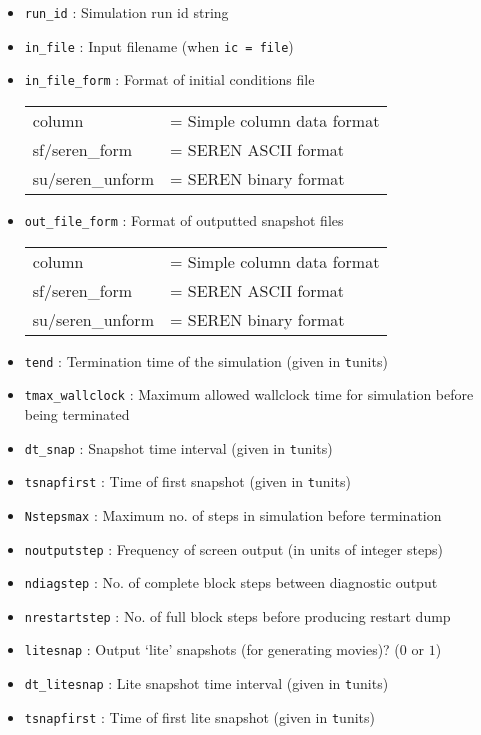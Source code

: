 \documentclass[a4paper]{article}
\newcommand{\var}[1]{\texttt{#1}}
\begin{document}
\begin{itemize}
\item \var{run\_id}  : Simulation run id string

\item \var{in\_file} : Input filename (when \var{ic = file})

\item \var{in\_file\_form} : Format of initial conditions file \\
\begin{tabular}{ll}
column           & = Simple column data format \\
sf/seren\_form   & = SEREN ASCII format \\
su/seren\_unform & = SEREN binary format
\end{tabular}

\item \var{out\_file\_form} : Format of outputted snapshot files \\
\begin{tabular}{ll}
column           & = Simple column data format \\
sf/seren\_form   & = SEREN ASCII format \\
su/seren\_unform & = SEREN binary format
\end{tabular}

\item \var{tend} : Termination time of the simulation (given in {\var tunit}s)

\item \var{tmax\_wallclock} : Maximum allowed wallclock time for simulation before being terminated

\item \var{dt\_snap} : Snapshot time interval (given in {\var tunit}s)

\item \var{tsnapfirst} : Time of first snapshot (given in {\var tunit}s)

\item \var{Nstepsmax} : Maximum no. of steps in simulation before termination

\item \var{noutputstep} : Frequency of screen output (in units of integer steps)

\item \var{ndiagstep} : No. of complete block steps between diagnostic output

\item \var{nrestartstep} : No. of full block steps before producing restart dump

\item \var{litesnap} : Output `lite' snapshots (for generating movies)? ($0$ or $1$)

\item \var{dt\_litesnap} : Lite snapshot time interval (given in {\var tunit}s)

\item \var{tsnapfirst} : Time of first lite snapshot (given in {\var tunit}s)

\end{itemize}
\end{document}
